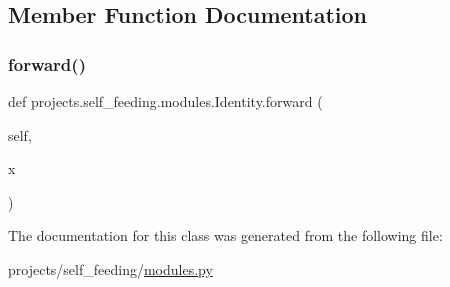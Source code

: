 \subsection{Member Function Documentation}
\mbox{\label{classprojects_1_1self__feeding_1_1modules_1_1Identity_a1979c4302e23f874290c2a0bc0688edf}} 
\subsubsection{\texorpdfstring{forward()}{forward()}}
{\footnotesize\ttfamily def projects.\+self\+\_\+feeding.\+modules.\+Identity.\+forward (\begin{DoxyParamCaption}\item[{}]{self,  }\item[{}]{x }\end{DoxyParamCaption})}



The documentation for this class was generated from the following file\+:\begin{DoxyCompactItemize}
\item 
projects/self\+\_\+feeding/\hyperlink{projects_2self__feeding_2modules_8py}{modules.\+py}\end{DoxyCompactItemize}
